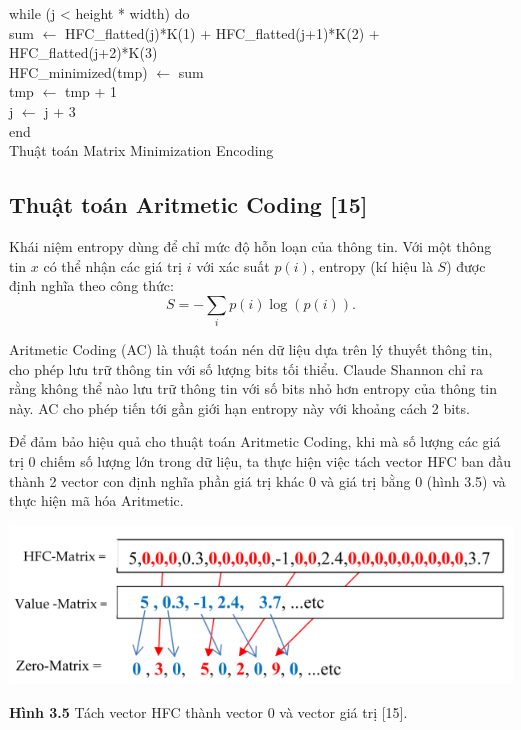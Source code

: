 \begin{algorithm}[H]
\hspace{10mm} while (j < height * width) do\\
\hspace{20mm} sum $\leftarrow$ HFC\_flatted(j)*K(1) + HFC\_flatted(j+1)*K(2) + HFC\_flatted(j+2)*K(3) \\
\hspace{20mm} HFC\_minimized(tmp) $\leftarrow$ sum\\
\hspace{20mm} tmp $\leftarrow$ tmp + 1\\
\hspace{20mm} j $\leftarrow$ j + 3\\
\hspace{10mm} end\\
 \caption{Thuật toán Matrix Minimization Encoding}
\end{algorithm}


\subsection{Thuật toán Aritmetic Coding [15]}
\par Khái niệm entropy dùng để chỉ mức độ hỗn loạn của thông tin. Với một thông tin $x$ có thể nhận các giá trị $i$ với xác suất $p(i)$, entropy (kí hiệu là $S$) được định nghĩa theo công thức:
$$S =  - \sum\limits_i {p(i)\log (p(i))}.$$
\par Aritmetic Coding (AC) là thuật toán nén dữ liệu dựa trên lý thuyết thông tin, cho phép lưu trữ thông tin với số lượng bits tối thiểu. Claude Shannon chỉ ra rằng không thể nào lưu trữ thông tin với số bits nhỏ hơn entropy của thông tin này. AC cho phép tiến tới gần giới hạn entropy này với khoảng cách 2 bits.
\par Để đảm bảo hiệu quả cho thuật toán Aritmetic Coding, khi mà số lượng các giá trị 0 chiếm số lượng lớn trong dữ liệu, ta thực hiện việc tách vector HFC ban đầu thành 2 vector con định nghĩa phần giá trị khác 0 và giá trị bằng 0 (hình 3.5) và thực hiện mã hóa Aritmetic. 
\begin{center}
    \includegraphics[scale=0.8]{Figures/fig22.png}
    \par \textbf {Hình 3.5} Tách vector HFC thành vector 0 và vector giá trị [15].
\end{center}

